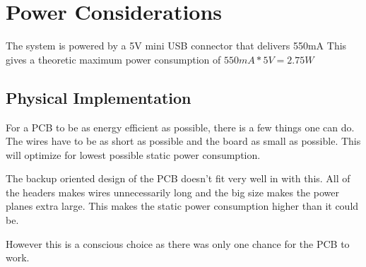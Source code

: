 \section{Power Considerations}

The system is powered by a 5V mini USB connector that delivers 550mA 
This gives a theoretic maximum power consumption of $550mA * 5V = 2.75W$

\subsection{Physical Implementation}

For a PCB to be as energy efficient as possible, there is a few things one can do.
The wires have to be as short as possible and the board as small as possible.
This will optimize for lowest possible static power consumption.

The backup oriented design of the PCB doesn't fit very well in with this.
All of the headers makes wires unnecessarily long and the big size makes the power planes extra large.
This makes the static power consumption higher than it could be.

However this is a conscious choice as there was only one chance for the PCB to work.



